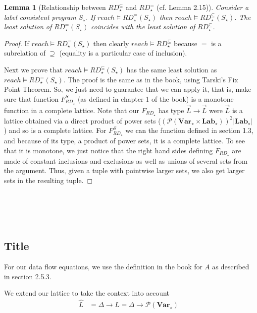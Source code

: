 \documentclass[a4wide,12pt]{article}
\theoremstyle{definition}
\theoremstyle{plain}
\newtheorem{lemma}[theo]{Lemma}
\theoremstyle{remark}
\def\pset#1{\mathcal{P}(#1)}
\def\Lab {\mathbf{Lab}}
\def\Var {\mathbf{Var}}
\begin{document}
\begin{lemma}[Relationship between $RD_\star^\subseteq$ and $RD_\star^=$ (cf. Lemma 2.15)]
Consider a label consistent program $S_\star$.  If $reach \models RD_\star^=(S_\star)$
then $reach \models RD_\star^\subseteq(S_\star)$. The least solution of $RD_\star^=(S_\star)$ coincides
with the least solution of $RD_\star^\subseteq$.
\end{lemma}
\begin{proof}
If $reach \models RD_\star^=(S_\star)$
then clearly $reach \models RD^\subseteq_\star$ because $=$ is a subrelation of $\supseteq$
(equality is a particular case of inclusion).

Next we prove that $reach \models RD_\star^\subseteq(S_\star)$ has the same least solution
as  $reach \models RD_\star^=(S_\star)$.
The proof is the same as in the book, using Tarski's Fix Point Theorem.
So, we just need to guarantee that we can apply it, that is, make sure that 
function $F_{RD_\star}^S$ (as defined in chapter 1 of the book) is a monotone
function in a complete lattice.
Note that our $F_{RD_\star}$
has type $\vec{L} \to \vec{L}$ were $\vec{L}$ is a lattice obtained via a direct product
of power sets ($(\pset{\Var_\star \times \Lab_\star})^2|\Lab_\star|$) and so is a complete lattice. 
For $F_{RD_\star}^S$ we can the function defined in section 1.3, and because of its
type, a product of power sets, it is a complete lattice. To see that it is monotone,
we just notice that the right hand sides defining $F_{RD_\star}$ are made of constant inclusions and
exclusions as well as unions of several sets from the argument. Thus, given a
tuple with pointwise larger sets, we also get larger sets in the resulting tuple.
\end{proof}


\section{~} 

\subsection{Title}

For our data flow equations, we use the definition in the book for $A$ as
described in section 2.5.3.

We extend our lattice to take the context into account
\begin{align}
\widehat{L} & = \Delta \to L = \Delta \to \pset{\Var_\star}
\end{align}
\end{document}
